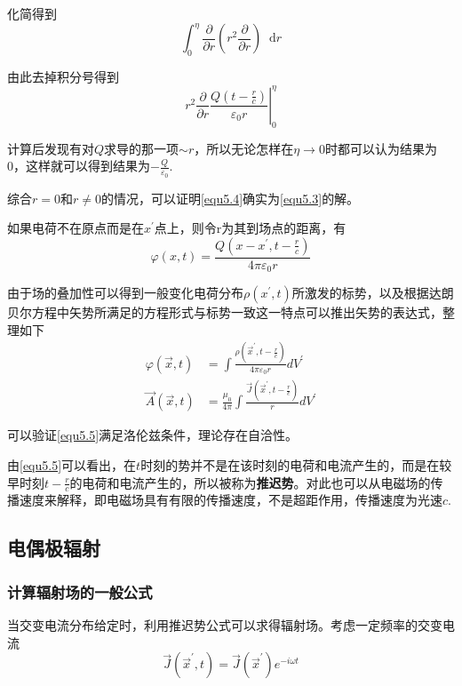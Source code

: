 \documentclass[UTF8]{ctexart}
\begin{document}
\noindent 化简得到
\begin{equation}
    \int_{0}^{\eta} \frac{\partial}{\partial r}\left(r^2 \frac{\partial}{\partial r}\right) \mathop{}\!\mathrm{d} r
\end{equation}

\noindent 由此去掉积分号得到
\begin{equation}
    \left.r^2 \frac{\partial}{\partial r} \frac{Q(t-\frac{r}{c})}{\varepsilon_0 r}\right|_0^{\eta}
\end{equation}

\noindent 计算后发现有对$Q$求导的那一项$\sim r$，所以无论怎样在$\eta \to 0$时都可以认为结果为0，这样就可以得到结果为$-\frac{Q}{\varepsilon_0}$.

    综合$r=0$和$r \neq 0$的情况，可以证明\autoref{equ5.4}确实为\autoref{equ5.3}的解。 

    如果电荷不在原点而是在$x^{\prime}$点上，则令r为其到场点的距离，有
    \begin{equation}
        \varphi(x, t)=\frac{Q\left(x-x^{\prime}, t-\frac{r}{c}\right)}{4 \pi \varepsilon_{0} r}
        \end{equation}

\noindent 由于场的叠加性可以得到一般变化电荷分布$\rho(x^{\prime},t)$所激发的标势，以及根据达朗贝尔方程中矢势所满足的方程形式与标势一致这一特点可以推出矢势的表达式，整理如下
\begin{equation}
    \begin{aligned}
        \varphi(\vec{x}, t)&=\int \frac{\rho\left(\vec{x}^{\prime}, t-\frac{r}{c}\right)}{4 \pi \varepsilon_{0} r} d V^{\prime} \\
        \vec{A}(\vec{x}, t)&=\frac{\mu_{0}}{4 \pi} \int \frac{\vec{J}\left(\vec{x}^{\prime}, t-\frac{r}{c}\right)}{r} d V^{\prime}
    \end{aligned}\label{equ5.5}
\end{equation}

\noindent 可以验证\autoref{equ5.5}满足洛伦兹条件，理论存在自洽性。

    由\autoref{equ5.5}可以看出，在$t$时刻的势并不是在该时刻的电荷和电流产生的，而是在较早时刻$t - \frac{r}{c}$的电荷和电流产生的，所以被称为\textbf{推迟势}。对此也可以从电磁场的传播速度来解释，即电磁场具有有限的传播速度，不是超距作用，传播速度为光速$c$.

    \subsection{电偶极辐射}
    \subsubsection{计算辐射场的一般公式}
    当交变电流分布给定时，利用推迟势公式可以求得辐射场。考虑一定频率的交变电流
    \begin{equation}
        \vec{J}(\vec{x}^{\prime},t) = \vec{J}(\vec{x}^{\prime})e^{-i \omega t}
    \end{equation}
\end{document}
